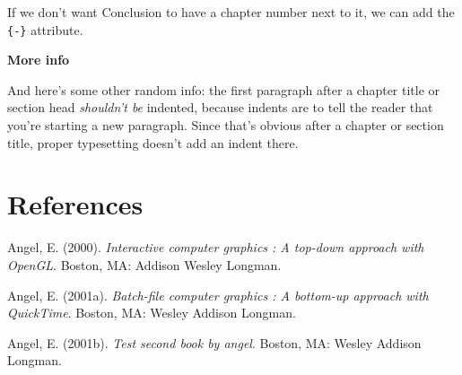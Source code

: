\documentclass[
11pt, %
oneside, %
english, %
singlespacing, %
]{macthesis} %
\newlength{\cslhangindent}
\newenvironment{CSLReferences}[2] %
{\begin{list}{}{%
	\setlength{\itemindent}{0pt}
	\setlength{\leftmargin}{0pt}
	\setlength{\parsep}{0pt}
	\ifodd #1
	\setlength{\leftmargin}{\cslhangindent}
	\setlength{\itemindent}{-1\cslhangindent}
	\fi
	\setlength{\itemsep}{#2\baselineskip}}}
{\end{list}}
\begin{document}
If we don't want Conclusion to have a chapter number next to it, we can add the \texttt{\{-\}} attribute.

\textbf{More info}

And here's some other random info: the first paragraph after a chapter title or section head \emph{shouldn't be} indented, because indents are to tell the reader that you're starting a new paragraph. Since that's obvious after a chapter or section title, proper typesetting doesn't add an indent there.

\backmatter

\chapter*{References}\label{references}


\noindent

\setlength{\parindent}{-0.20in}
\setlength{\leftskip}{0.20in}
\setlength{\parskip}{8pt}

\label{refs}
\begin{CSLReferences}{1}{0}
Angel, E. (2000). \emph{Interactive computer graphics : A top-down approach with OpenGL}. Boston, MA: Addison Wesley Longman.

Angel, E. (2001a). \emph{Batch-file computer graphics : A bottom-up approach with QuickTime}. Boston, MA: Wesley Addison Longman.

Angel, E. (2001b). \emph{Test second book by angel}. Boston, MA: Wesley Addison Longman.

\end{CSLReferences}
\end{document}

